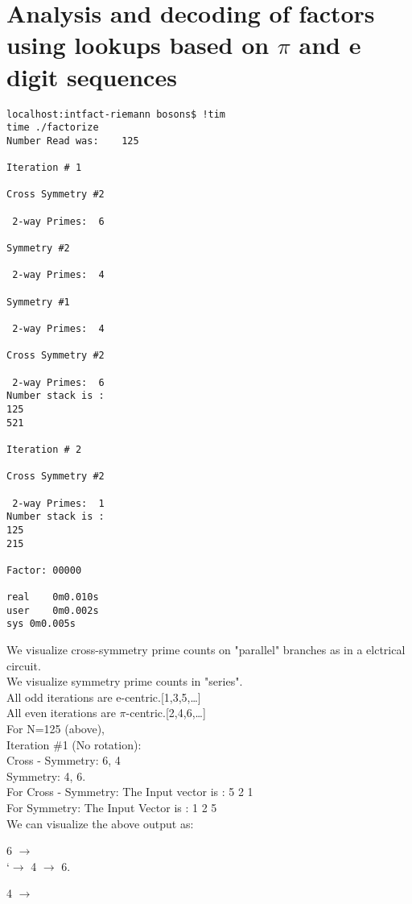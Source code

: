 \section{Analysis and decoding of factors using lookups based on $\pi$ and e digit sequences}
\begin{verbatim}
localhost:intfact-riemann bosons$ !tim
time ./factorize
Number Read was: 	125

Iteration #	1

Cross Symmetry #2

 2-way Primes: 	6

Symmetry #2

 2-way Primes: 	4

Symmetry #1

 2-way Primes: 	4

Cross Symmetry #2

 2-way Primes: 	6
Number stack is :
125
521

Iteration #	2

Cross Symmetry #2

 2-way Primes: 	1
Number stack is :
125
215

Factor:	00000

real	0m0.010s
user	0m0.002s
sys	0m0.005s
\end{verbatim}

We visualize cross-symmetry prime counts on "parallel" branches as in a elctrical circuit.\\
We visualize symmetry prime counts in "series".\\
All odd iterations are e-centric.[1,3,5,\ldots ]\\
All even iterations are $\pi$-centric.[2,4,6,\ldots ]\\
For N=125 (above),\\
Iteration \#1 (No rotation):\\
Cross - Symmetry: 6, 4\\
Symmetry: 4, 6.\\

For Cross - Symmetry: The Input vector is : 5 2 1\\
For Symmetry: The Input Vector is : 1 2 5 \\

We can visualize the above output as:\\

\raggedright 6 $\rightarrow$\\
      \raggedleft`$\rightarrow$ 4 $\rightarrow$ 6.\\
\raggedright 4 $\rightarrow$\\


